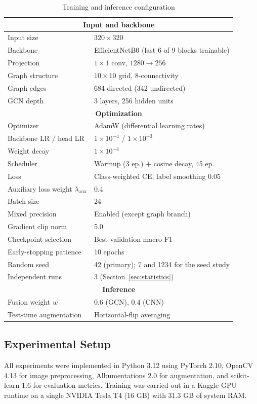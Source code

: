 \documentclass[journal]{IEEEtran}
\begin{document}
\begin{table}[!t]
\centering
\caption{Training and inference configuration}
\label{tab:hyperparameters}
\footnotesize
\begin{tabular}{@{}l l@{}}
\toprule
\multicolumn{2}{c}{\textbf{Input and backbone}} \\
\midrule
Input size & $320 \times 320$ \\
Backbone & EfficientNetB0 (last 6 of 9 blocks trainable) \\
Projection & $1\times1$ conv, $1280\rightarrow256$ \\
Graph structure & $10\times10$ grid, 8-connectivity \\
Graph edges & 684 directed (342 undirected) \\
GCN depth & 3 layers, 256 hidden units \\
\midrule
\multicolumn{2}{c}{\textbf{Optimization}} \\
\midrule
Optimizer & AdamW (differential learning rates) \\
Backbone LR / head LR & $1\times10^{-4}$ / $1\times10^{-3}$ \\
Weight decay & $1\times10^{-4}$ \\
Scheduler & Warmup (3 ep.) + cosine decay, 45 ep. \\
Loss & Class-weighted CE, label smoothing $0.05$ \\
Auxiliary loss weight $\lambda_{\text{aux}}$ & 0.4 \\
Batch size & 24 \\
Mixed precision & Enabled (except graph branch) \\
Gradient clip norm & 5.0 \\
Checkpoint selection & Best validation macro F1 \\
Early-stopping patience & 10 epochs \\
Random seed & 42 (primary); 7 and 1234 for the seed study \\
Independent runs & 3 (Section~\ref{sec:statistics}) \\
\midrule
\multicolumn{2}{c}{\textbf{Inference}} \\
\midrule
Fusion weight $w$ & 0.6 (GCN), 0.4 (CNN) \\
Test-time augmentation & Horizontal-flip averaging \\
\bottomrule
\end{tabular}
\end{table}

\subsection{Experimental Setup}
\label{sec:expsetup}
All experiments were implemented in Python 3.12 using PyTorch 2.10, OpenCV 4.13
for image preprocessing, Albumentations 2.0 \cite{buslaev2020albumentations} for
augmentation, and scikit-learn 1.6 for evaluation metrics. Training was carried
out in a Kaggle GPU runtime on a single NVIDIA Tesla T4 (16 GB) with 31.3 GB of
system RAM.
\end{document}
